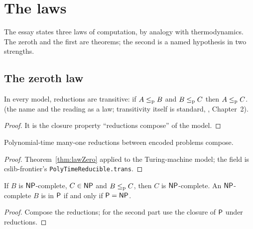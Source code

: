 \chapter{The laws}
\label{chap:laws}

The essay states three laws of computation, by analogy with thermodynamics. The zeroth and the
first are theorems; the second is a named hypothesis in two strengths.

\section{The zeroth law}

\begin{theorem}
  \label{thm:lawZero}
  \leanok
  In every model, reductions are transitive: if $A \le_{\mathrm{p}} B$ and $B \le_{\mathrm{p}} C$ then $A \le_{\mathrm{p}} C$.
  \own{} (the name and the reading as a law; transitivity itself is standard,
  \cite{AroraBarak}, Chapter~2).
\end{theorem}

\begin{proof}
  \leanok
  It is the closure property ``reductions compose'' of the model.
\end{proof}

\begin{corollary}
  \label{cor:lawZero-tm}
  \leanok
  Polynomial-time many-one reductions between encoded problems compose.
\end{corollary}

\begin{proof}
  \leanok
  Theorem~\ref{thm:lawZero} applied to the Turing-machine model; the field is cslib-frontier's
  \texttt{PolyTimeReducible.trans}.
\end{proof}

\begin{lemma}
  \label{lem:npcomplete-reduces}
  \leanok
  If $B$ is $\mathsf{NP}$-complete, $C \in \mathsf{NP}$ and $B \le_{\mathrm{p}} C$, then $C$ is $\mathsf{NP}$-complete. An
  $\mathsf{NP}$-complete $B$ is in $\mathsf{P}$ if and only if $\mathsf{P} = \mathsf{NP}$.
\end{lemma}

\begin{proof}
  \leanok
  Compose the reductions; for the second part use the closure of $\mathsf{P}$ under reductions.
\end{proof}

